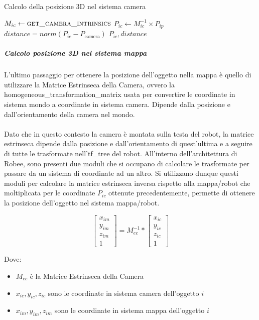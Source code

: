 \begin{algorithm}[h]
	\caption{Calcolo della posizione 3D nel sistema camera}
	\begin{algorithmic}[1]
		\State $M_{ic} \gets \Call{get\_camera\_intrinsics}{}$ 
		\State $P_{ic} \gets M_{ic}^{-1} \times P_{ip}$
		\State $distance = norm(P_{ic} - P_{\text{camera}})$
		\State \Return $P_{ic}, distance$
		\EndProcedure
	\end{algorithmic}
\end{algorithm}

\subparagraph{Calcolo posizione 3D nel sistema mappa}
L'ultimo passaggio per ottenere la posizione dell'oggetto nella mappa è quello di utilizzare la Matrice Estrinseca della Camera, ovvero la \gls{homogeneous_transformation_matrix} usata per convertire le coordinate in sistema mondo a coordinate in sistema camera. Dipende dalla posizione e dall'orientamento della camera nel mondo. \\\\
Dato che in questo contesto la camera è montata sulla testa del robot, la matrice estrinseca dipende dalla posizione e dall'orientamento di quest'ultima e a seguire di tutte le trasformate nell'\gls{tf_tree} del robot. All'interno dell'architettura di Robee, sono presenti due moduli che si occupano di calcolare le trasformate per passare da un sistema di coordinate ad un altro. Si utilizzano dunque questi moduli per calcolare la matrice estrinseca inversa rispetto alla mappa/robot che moltiplicata per le coordinate $P_{ic}$ ottenute precedentemente, permette di ottenere la posizione dell'oggetto nel sistema mappa/robot.

\[
	\begin{bmatrix}
		x_{im} \\
		y_{im} \\
		z_{im} \\
		1
	\end{bmatrix}
	=
	M_{ec}^{-1}
	*
	\begin{bmatrix}
		x_{ic} \\
		y_{ic} \\
		z_{ic} \\
		1
	\end{bmatrix}
\]

Dove:
\begin{itemize}
	\item $M_{ec}$ è la Matrice Estrinseca della Camera
	\item $x_{ic}, y_{ic}, z_{ic}$ sono le coordinate in sistema camera dell'oggetto $i$
	\item $x_{im}, y_{im}, z_{im}$ sono le coordinate in sistema mappa dell'oggetto $i$
\end{itemize}

